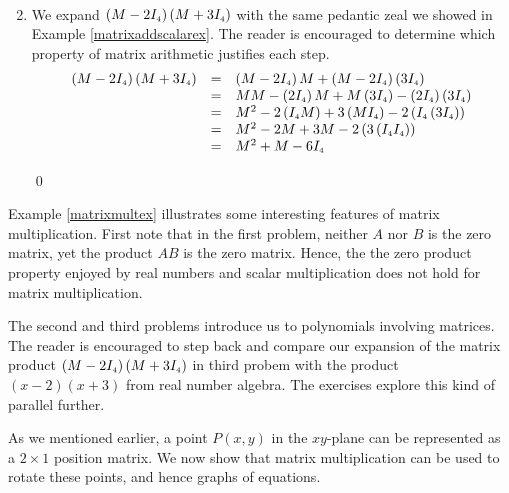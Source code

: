 \documentclass{ximera}
\begin{document}
\begin{ex}
\begin{enumerate}
\[\begin{array}{rcl}
\end{array} \]

\item  We expand $\left(M - 2I_{\mbox{\tiny$4$}}\right)\left(M + 3I_{\mbox{\tiny$4$}}\right)$ with the same pedantic zeal we showed in Example \ref{matrixaddscalarex}. The reader is encouraged to determine which property of matrix arithmetic justifies each step.
\[\begin{array}{rcl}

\left(M - 2I_{\mbox{\tiny$4$}}\right)\left(M + 3I_{\mbox{\tiny$4$}}\right) & = & \left(M - 2I_{\mbox{\tiny$4$}}\right) M + \left(M - 2I_{\mbox{\tiny$4$}}\right)\left( 3I_{\mbox{\tiny$4$}}\right) \\
& = & MM - \left(2I_{\mbox{\tiny$4$}}\right)M + M\left( 3I_{\mbox{\tiny$4$}}\right) - \left( 2I_{\mbox{\tiny$4$}}\right)\left( 3I_{\mbox{\tiny$4$}}\right) \\
& = & M^2 -2 \left(I_{\mbox{\tiny$4$}}M\right) +3\left( M I_{\mbox{\tiny$4$}}\right) - 2\left( I_{\mbox{\tiny$4$}}\left( 3I_{\mbox{\tiny$4$}}\right)\right) \\
& = & M^2 - 2M  + 3M - 2\left(3\left( I_{\mbox{\tiny$4$}}I_{\mbox{\tiny$4$}}\right)\right) \\
& = & M^2 +M  - 6I_{\mbox{\tiny$4$}}  \\

\end{array}\]

\qed
\end{enumerate}

\end{ex}

Example \ref{matrixmultex} illustrates some interesting features of matrix multiplication.  First note that in the first problem, neither $A$ nor $B$ is the zero matrix, yet the product $AB$ is the zero matrix.  Hence, the the zero product property enjoyed by real numbers and scalar multiplication does not hold for matrix multiplication. 

The second and third problems  introduce us to polynomials involving matrices.  The reader is encouraged to step back and compare our expansion of the matrix product $\left(M - 2I_{\mbox{\tiny$4$}}\right)\left(M + 3I_{\mbox{\tiny$4$}}\right)$ in third probem with the product $(x-2)(x+3)$ from real number algebra.  The exercises explore this kind of parallel further.  

\smallskip

As we mentioned earlier, a point $P(x,y)$ in the $xy$-plane can be represented as a $2 \times 1$ position matrix.  We now show that matrix multiplication can be used to rotate these points, and hence graphs of equations.
\end{document}
